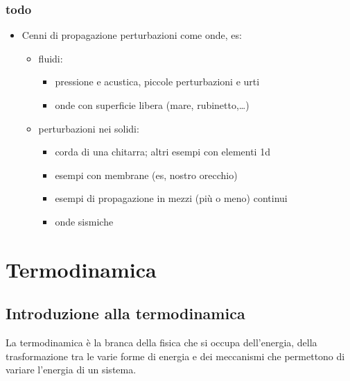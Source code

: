 \documentclass[letterpaper,10pt,italian]{jupyterBook}
\begin{document}
\section{todo}
\label{\detokenize{ch/continuum/intro:todo}}\begin{itemize}
\item {} 
\sphinxAtStartPar
Cenni di propagazione perturbazioni come onde, es:
\begin{itemize}
\item {} 
\sphinxAtStartPar
fluidi:
\begin{itemize}
\item {} 
\sphinxAtStartPar
pressione e acustica, piccole perturbazioni e urti

\item {} 
\sphinxAtStartPar
onde con superficie libera (mare, rubinetto,…)

\end{itemize}

\item {} 
\sphinxAtStartPar
perturbazioni nei solidi:
\begin{itemize}
\item {} 
\sphinxAtStartPar
corda di una chitarra; altri esempi con elementi 1d

\item {} 
\sphinxAtStartPar
esempi con membrane (es, nostro orecchio)

\item {} 
\sphinxAtStartPar
esempi di propagazione in mezzi (più o meno) continui

\item {} 
\sphinxAtStartPar
onde sismiche

\end{itemize}

\end{itemize}

\end{itemize}

\sphinxstepscope


\part{Termodinamica}

\sphinxstepscope


\chapter{Introduzione alla termodinamica}
\label{\detokenize{ch/thermodynamics/foundation:introduzione-alla-termodinamica}}\label{\detokenize{ch/thermodynamics/foundation:physics-hs-thermodynamics-intro}}\label{\detokenize{ch/thermodynamics/foundation::doc}}
\sphinxAtStartPar
La termodinamica è la branca della fisica che si occupa dell’energia, della trasformazione tra le varie forme di energia e dei meccanismi che permettono di variare l’energia di un sistema.
\end{document}

